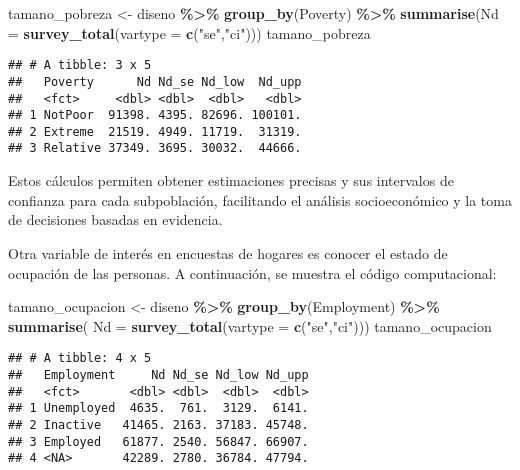 \documentclass[
  12pt,
]{book}
\newenvironment{Shaded}{\begin{snugshade}}{\end{snugshade}}
\newcommand{\AttributeTok}[1]{\textcolor[rgb]{0.13,0.29,0.53}{#1}}
\newcommand{\FunctionTok}[1]{\textcolor[rgb]{0.13,0.29,0.53}{\textbf{#1}}}
\newcommand{\NormalTok}[1]{#1}
\newcommand{\OtherTok}[1]{\textcolor[rgb]{0.56,0.35,0.01}{#1}}
\newcommand{\SpecialCharTok}[1]{\textcolor[rgb]{0.81,0.36,0.00}{\textbf{#1}}}
\newcommand{\StringTok}[1]{\textcolor[rgb]{0.31,0.60,0.02}{#1}}
\begin{document}
\begin{Shaded}
\begin{Highlighting}[]
\NormalTok{tamano\_pobreza }\OtherTok{\textless{}{-}}\NormalTok{ diseno }\SpecialCharTok{\%\textgreater{}\%} \FunctionTok{group\_by}\NormalTok{(Poverty) }\SpecialCharTok{\%\textgreater{}\%} 
                  \FunctionTok{summarise}\NormalTok{(}\AttributeTok{Nd =} \FunctionTok{survey\_total}\NormalTok{(}\AttributeTok{vartype =} \FunctionTok{c}\NormalTok{(}\StringTok{"se"}\NormalTok{,}\StringTok{"ci"}\NormalTok{)))}
\NormalTok{tamano\_pobreza}
\end{Highlighting}
\end{Shaded}

\begin{verbatim}
## # A tibble: 3 x 5
##   Poverty      Nd Nd_se Nd_low  Nd_upp
##   <fct>     <dbl> <dbl>  <dbl>   <dbl>
## 1 NotPoor  91398. 4395. 82696. 100101.
## 2 Extreme  21519. 4949. 11719.  31319.
## 3 Relative 37349. 3695. 30032.  44666.
\end{verbatim}

Estos cálculos permiten obtener estimaciones precisas y sus intervalos de confianza para cada subpoblación, facilitando el análisis socioeconómico y la toma de decisiones basadas en evidencia.

Otra variable de interés en encuestas de hogares es conocer el estado de ocupación de las personas. A continuación, se muestra el código computacional:

\begin{Shaded}
\begin{Highlighting}[]
\NormalTok{tamano\_ocupacion }\OtherTok{\textless{}{-}}\NormalTok{ diseno }\SpecialCharTok{\%\textgreater{}\%} 
                    \FunctionTok{group\_by}\NormalTok{(Employment) }\SpecialCharTok{\%\textgreater{}\%} 
                    \FunctionTok{summarise}\NormalTok{( }\AttributeTok{Nd =} \FunctionTok{survey\_total}\NormalTok{(}\AttributeTok{vartype =} \FunctionTok{c}\NormalTok{(}\StringTok{"se"}\NormalTok{,}\StringTok{"ci"}\NormalTok{)))}
\NormalTok{tamano\_ocupacion}
\end{Highlighting}
\end{Shaded}

\begin{verbatim}
## # A tibble: 4 x 5
##   Employment     Nd Nd_se Nd_low Nd_upp
##   <fct>       <dbl> <dbl>  <dbl>  <dbl>
## 1 Unemployed  4635.  761.  3129.  6141.
## 2 Inactive   41465. 2163. 37183. 45748.
## 3 Employed   61877. 2540. 56847. 66907.
## 4 <NA>       42289. 2780. 36784. 47794.
\end{verbatim}
\end{document}
